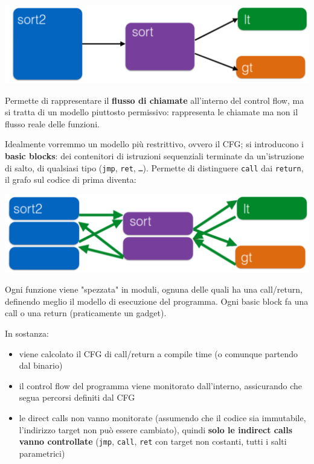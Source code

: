 \begin{center}
	\includegraphics[width=0.8\linewidth]{img/cfi/call1}
\end{center}

Permette di rappresentare il \textbf{flusso di chiamate} all'interno del control flow, ma si tratta di un modello piuttosto permissivo: rappresenta le chiamate ma non il flusso reale delle funzioni. 

Idealmente vorremmo un modello più restrittivo, ovvero il CFG; si introducono i \textbf{basic blocks}: dei contenitori di istruzioni sequenziali terminate da un'istruzione di salto, di qualsiasi tipo (\texttt{jmp}, \texttt{ret}, \texttt{\dots}). Permette di distinguere \texttt{call} dai \texttt{return}, il grafo sul codice di prima diventa:
\begin{center}
	\includegraphics[width=0.8\linewidth]{img/cfi/call2}
\end{center}

Ogni funzione viene "spezzata" in moduli, ognuna delle quali ha una call/return, definendo meglio il modello di esecuzione del programma. Ogni basic block fa una call o una return (praticamente un gadget). 

In sostanza: 
\begin{itemize}
	\item viene calcolato il CFG di call/return a compile time (o comunque partendo dal binario)
	\item il control flow del programma viene monitorato dall'interno, assicurando che segua percorsi definiti dal CFG
	\item le direct calls non vanno monitorate (assumendo che il codice sia immutabile, l'indirizzo target non può essere cambiato), quindi \textbf{solo le indirect calls vanno controllate} (\texttt{jmp}, \texttt{call}, \texttt{ret} con target non costanti, tutti i salti parametrici)
\end{itemize}

